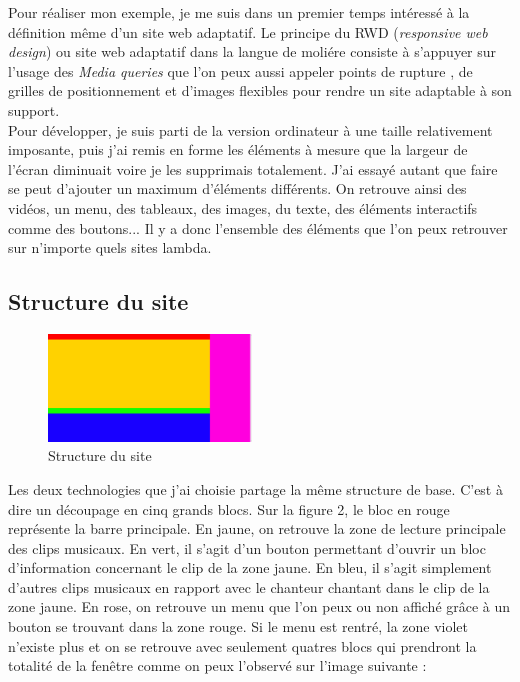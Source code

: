 \documentclass{article}
\begin{document}
Pour r\'ealiser mon exemple, je me suis dans un premier temps int\'eress\'e \`a la d\'efinition m\^eme d'un site web adaptatif. Le principe du RWD (\textit{responsive web design}) ou site web adaptatif dans la langue de moli\'ere consiste \`a s'appuyer sur l'usage des \textit{Media queries} que l'on peux aussi appeler \og points de rupture \fg , de grilles de positionnement et d'images flexibles pour rendre un site adaptable \`a son support.\\
Pour d\'evelopper, je suis parti de la version ordinateur \`a une taille relativement imposante, puis j'ai remis en forme les \'el\'ements \`a mesure que la largeur de l'\'ecran diminuait voire je les supprimais totalement. J'ai essay\'e autant que faire se peut d'ajouter un maximum d'\'el\'ements diff\'erents. On retrouve ainsi des vid\'eos, un menu, des tableaux, des images, du texte, des \'el\'ements interactifs comme des boutons... Il y a donc l'ensemble des \'el\'ements que l'on peux retrouver sur n'importe quels sites lambda. \\

\subsection{Structure du site}

\begin{figure}
  \vspace{-20pt}
  \begin{center}
    \includegraphics[width=0.48\textwidth]{p3}
  \end{center}
  \vspace{-20pt}
  \caption{Structure du site}
  \vspace{-10pt}
\end{figure}

Les deux technologies que j'ai choisie partage la m\^eme structure de base. C'est \`a dire un d\'ecoupage en cinq grands blocs. Sur la figure 2, le bloc en rouge repr\'esente la barre principale. En jaune, on retrouve la zone de lecture principale des clips musicaux. En vert, il s'agit d'un bouton permettant d'ouvrir un bloc d'information concernant le clip de la zone jaune. En bleu, il s'agit simplement d'autres clips musicaux en rapport avec le chanteur chantant dans le clip de la zone jaune. En rose, on retrouve un menu que l'on peux ou non affich\'e gr\^ace \`a un bouton se trouvant dans la zone rouge. Si le menu est rentr\'e, la zone violet n'existe plus et on se retrouve avec seulement quatres blocs qui prendront la totalit\'e de la fen\^etre comme on peux l'observ\'e sur l'image suivante :\\
\end{document}
